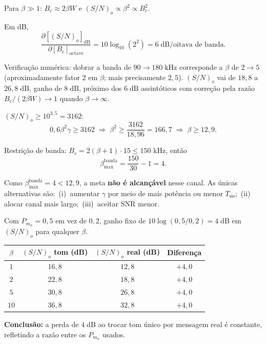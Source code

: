 \documentclass[11pt,a4paper]{article}
\begin{document}
\begin{resolucao}

Para $\beta \gg 1$: $B_c \approx 2\beta W$ e $(S/N)_o \propto \beta^2 \propto B_c^2$.

Em dB,
\[
  \frac{\partial[(S/N)_o]_{\text{dB}}}{\partial[B_c]_{\text{octave}}} = 10\log_{10}(2^2) = \boxed{6\;\text{dB/oitava de banda.}}
\]

Verificação numérica: dobrar a banda de $90 \to 180\;\text{kHz}$ corresponde a $\beta$ de $2 \to 5$ (aproximadamente fator 2 em $\beta$; mais precisamente $2{,}5$). $(S/N)_o$ vai de $18{,}8$ a $26{,}8\;\text{dB}$, ganho de $8\;\text{dB}$, próximo dos $6\;\text{dB}$ assintóticos com correção pela razão $B_c/(2\beta W) \to 1$ quando $\beta \to \infty$.
\end{resolucao}

\begin{resolucao}

$(S/N)_o \ge 10^{3{,}5} = 3162$:
\[
  0{,}6\beta^2 \gamma \ge 3162 \;\Rightarrow\; \beta^2 \ge \frac{3162}{18{,}96} = 166{,}7 \;\Rightarrow\; \beta \ge 12{,}9.
\]

Restrição de banda: $B_c = 2(\beta+1)\cdot 15 \le 150$ kHz, então
\[
  \beta_{\max}^{\text{banda}} = \frac{150}{30} - 1 = 4.
\]

Como $\beta_{\max}^{\text{banda}} = 4 < 12{,}9$, a meta \textbf{não é alcançável} nesse canal. As únicas alternativas são: \,(i)\, aumentar $\gamma$ por meio de mais potência ou menor $T_{\text{sis}}$;\, (ii)\, alocar canal mais largo;\, (iii)\, aceitar SNR menor.
\end{resolucao}

\begin{resolucao}

Com $P_{m_n} = 0{,}5$ em vez de $0{,}2$, ganho fixo de $10\log(0{,}5/0{,}2) = 4\;\text{dB}$ em $(S/N)_o$ para qualquer $\beta$.

\begin{center}
\begin{tabular}{cccc}
\toprule
$\beta$ & $(S/N)_o$ tom (dB) & $(S/N)_o$ real (dB) & Diferença \\
\midrule
$1$  & $16{,}8$ & $12{,}8$ & $+4{,}0$ \\
$2$  & $22{,}8$ & $18{,}8$ & $+4{,}0$ \\
$5$  & $30{,}8$ & $26{,}8$ & $+4{,}0$ \\
$10$ & $36{,}8$ & $32{,}8$ & $+4{,}0$ \\
\bottomrule
\end{tabular}
\end{center}

\textbf{Conclusão:} a perda de $4\;\text{dB}$ ao trocar tom único por mensagem real é constante, refletindo a razão entre os $P_{m_n}$ usados.
\end{resolucao}
\end{document}
